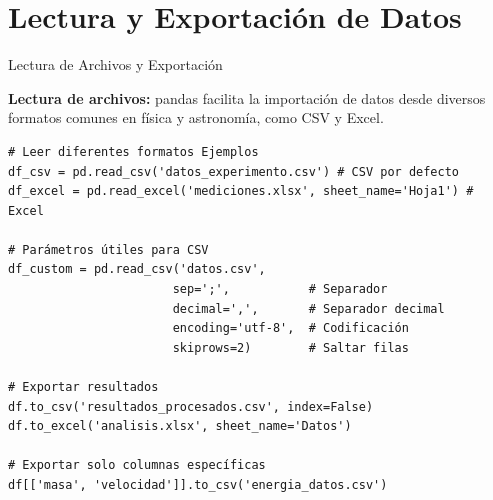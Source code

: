 \documentclass[10pt]{beamer}
\begin{document}
\section{Lectura y Exportación de Datos}

\begin{frame}[fragile]{Lectura de Archivos y Exportación}

 \textbf{Lectura de archivos:} pandas facilita la importación de datos desde diversos formatos comunes en física y astronomía, como CSV y Excel.

\begin{verbatim}
# Leer diferentes formatos Ejemplos
df_csv = pd.read_csv('datos_experimento.csv') # CSV por defecto
df_excel = pd.read_excel('mediciones.xlsx', sheet_name='Hoja1') # Excel

# Parámetros útiles para CSV
df_custom = pd.read_csv('datos.csv', 
                       sep=';',           # Separador
                       decimal=',',       # Separador decimal
                       encoding='utf-8',  # Codificación
                       skiprows=2)        # Saltar filas

# Exportar resultados
df.to_csv('resultados_procesados.csv', index=False)
df.to_excel('analisis.xlsx', sheet_name='Datos')

# Exportar solo columnas específicas
df[['masa', 'velocidad']].to_csv('energia_datos.csv')
\end{verbatim}
\end{frame}

\end{document}
